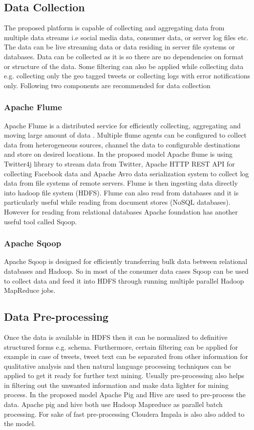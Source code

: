 \subsection{Data Collection}
The proposed platform is capable of collecting and aggregating data from multiple data streams i.e social media data, consumer data, or server log files etc. The data can be live streaming data or data residing in server file systems or databases. Data can be collected as it is so there are no dependencies on format or structure of the data. Some filtering can also be applied while collecting data e.g. collecting only the geo tagged tweets or collecting logs with error notifications only. Following two components are recommended for data collection
\subsubsection{Apache Flume}
Apache Flume is a distributed service for efficiently collecting, aggregating and moving large amount of data \cite{flume}. Multiple flume agents can be configured to collect data from heterogeneous sources, channel the data to configurable destinations and store on desired locations. In the proposed model Apache flume is using Twitter4j library to stream data from Twitter, Apache HTTP REST API for collecting Facebook data and Apache Avro\cite{avro} data serialization system to collect log data from file systems of remote servers. Flume is then ingesting data directly into hadoop file system (HDFS). Flume can also read from databases and it is particularly useful while reading from document stores (NoSQL databases). However for reading from relational databases Apache foundation has another useful tool called Sqoop.
\subsubsection{Apache Sqoop}
Apache Sqoop \cite{sqoop} is designed for efficiently transferring bulk data between relational databases and Hadoop. So in most of the consumer data cases Sqoop can be used to collect data and feed it into HDFS through running multiple parallel Hadoop MapReduce jobs.
\subsection{Data Pre-processing}
Once the data is available in HDFS then it can be normalized to definitive structured forms e.g. schema. Furthermore, certain filtering can be applied for example in case of tweets, tweet text can be separated from other information for qualitative analysis and then natural language processing techniques can be applied to get it ready for further text mining. Usually pre-processing also helps in filtering out the unwanted information and make data lighter for mining process. In the proposed model Apache Pig and Hive are used to pre-process the data. Apache pig and hive both use Hadoop Mapreduce as parallel batch processing. For sake of fast pre-processing Cloudera Impala is also also added to the model.
